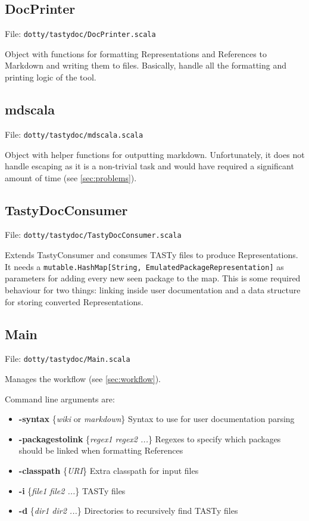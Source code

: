 \documentclass{report}
\begin{document}
\subsection{DocPrinter}
File: \texttt{dotty/tastydoc/DocPrinter.scala}

Object with functions for formatting Representations and References to Markdown and writing them to files. Basically, handle all the formatting and printing logic of the tool.

\subsection{mdscala}
File: \texttt{dotty/tastydoc/mdscala.scala}

Object with helper functions for outputting markdown. Unfortunately, it does not handle escaping as it is a non-trivial task and would have required a significant amount of time (see \autoref{sec:problems}).

\subsection{TastyDocConsumer}
File: \texttt{dotty/tastydoc/TastyDocConsumer.scala}

Extends TastyConsumer and consumes TASTy files to produce Representations. It needs a \texttt{mutable.HashMap[String, EmulatedPackageRepresentation]} as parameters for adding every new seen package to the map. This is some required behaviour for two things: linking inside user documentation and a data structure for storing converted Representations.
\subsection{Main}
File: \texttt{dotty/tastydoc/Main.scala}

Manages the workflow (see \autoref{sec:workflow}).

Command line arguments are:
\begin{itemize}
    \item \textbf{-syntax} \{\textit{wiki} or \textit{markdown}\} Syntax to use for user documentation parsing
    \item \textbf{-packagestolink} \{\textit{regex1 regex2 ...}\} Regexes to specify which packages should be linked when formatting References
    \item \textbf{-classpath} \{\textit{URI}\} Extra classpath for input files
    \item \textbf{-i} \{\textit{file1 file2 ...}\} TASTy files
    \item \textbf{-d} \{\textit{dir1 dir2 ...}\} Directories to recursively find TASTy files
\end{itemize}
\end{document}
